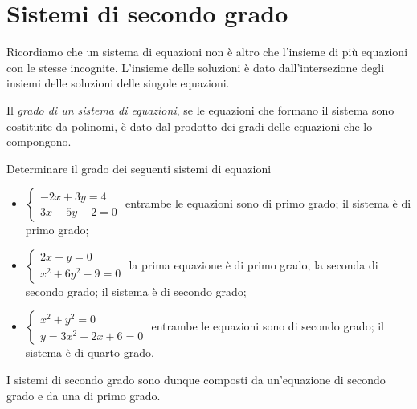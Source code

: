 
\section{Sistemi di secondo grado}
\label{sec:eq2gr_sistemi}

Ricordiamo che un sistema di equazioni non è altro che l'insieme di più 
equazioni con le stesse incognite. L'insieme delle soluzioni è dato 
dall'intersezione degli insiemi delle soluzioni delle singole equazioni.

\begin{definizione}
Il \emph{grado di un sistema di equazioni}, se le equazioni che formano il 
sistema sono costituite da polinomi, è dato dal prodotto dei gradi delle 
equazioni che lo compongono.
\end{definizione}

\begin{esempio}
Determinare il grado dei seguenti sistemi di equazioni

\begin{itemize}
\item \(\left\{\begin{array}{l}-2x+3y=4 \\3x+5y-2=0\end{array}\right.\) 
entrambe 
le equazioni sono di primo grado; il sistema è di primo grado;
\item \(\left\{\begin{array}{l}2x-y=0 \\x^2+6y^2-9=0\end{array}\right.\) la 
prima 
equazione è di primo grado, la seconda di secondo grado; il sistema è di 
secondo 
grado;
\item \(\left\{\begin{array}{l}x^2+y^2=0 \\y=3x^2-2x+6=0\end{array}\right.\) 
entrambe le equazioni sono di secondo grado; il sistema è di quarto grado.
\end{itemize}
\end{esempio}
I sistemi di secondo grado sono dunque composti da un'equazione di secondo 
grado 
e da una di primo grado.

